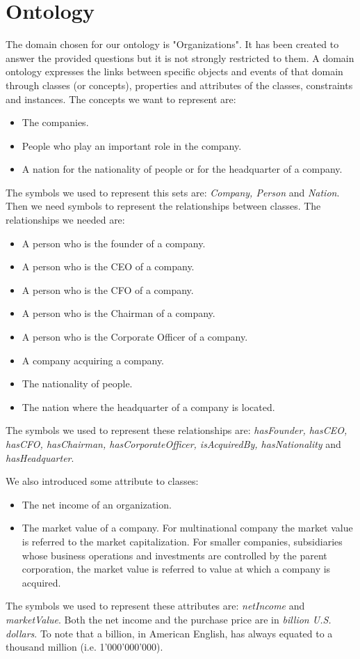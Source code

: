 \section{Ontology}
\label{sec:ontology}
The domain chosen for our ontology is "Organizations". It has been created to answer the provided questions but it is not strongly restricted to them. A domain ontology expresses the links between specific objects and events of that domain through classes (or concepts), properties and attributes of the classes, constraints and instances.
The concepts we want to represent are:
\begin{itemize}
\item The companies.
\item People who play an important role in the company.
\item A nation for the nationality of people or for the headquarter of a company.
\end{itemize}
The symbols we used to represent this sets are: \textit{Company, Person} and \textit{Nation}.
Then we need symbols to represent the relationships between classes. The relationships we needed are:
\begin{itemize}
\item A person who is the founder of a company.
\item A person who is the CEO of a company.
\item A person who is the CFO of a company.
\item A person who is the Chairman of a company.
\item A person who is the Corporate Officer of a company.
\item A company acquiring a company.
\item The nationality of people.
\item The nation where the headquarter of a company is located.
\end{itemize}
The symbols we used to represent these relationships are: \textit{hasFounder, hasCEO, hasCFO, hasChairman, hasCorporateOfficer, isAcquiredBy, hasNationality} and \textit{hasHeadquarter}. 

We also introduced some attribute to classes:
\begin{itemize}
\item The net income of an organization.
\item The market value of a company. For multinational company the market value is referred to the market capitalization. For smaller companies, subsidiaries whose business operations and investments are controlled by the parent corporation, the market value is referred to value at which a company is acquired.
\end{itemize}
The symbols we used to represent these attributes are: \textit{ netIncome} and \textit{marketValue}.
Both the net income and the purchase price are in \textit{billion U.S. dollars}. To note that a billion, in American English, has always equated to a thousand million (i.e. 1'000'000'000).

